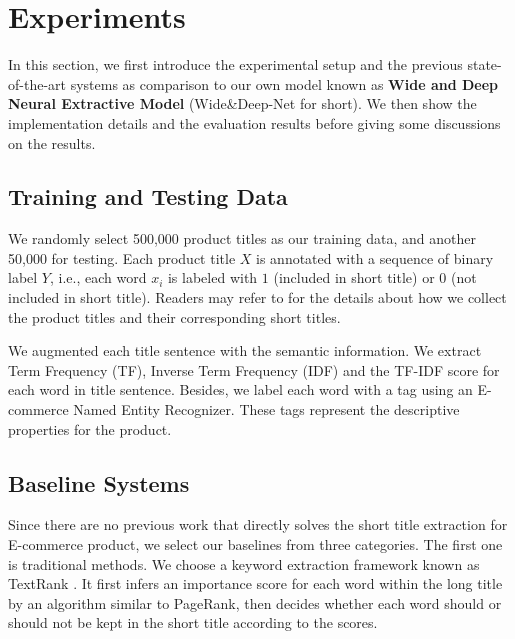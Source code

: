 \section{Experiments}
In this section, we first introduce the experimental setup and the
previous state-of-the-art systems as comparison to 
our own model known as \textbf{Wide and Deep Neural Extractive Model} (Wide\&Deep-Net for short).
We then show the implementation details and the evaluation results before
giving some discussions on the results.

\subsection{Training and Testing Data}

We randomly select 500,000 product titles as our training data, 
and another 50,000 for testing.
Each product title $X$ is annotated with a sequence of binary label $Y$,
i.e., each word $x_i$ is labeled with $1$ (included in short title) 
or $0$ (not included in short title). Readers may refer to  
for the details about how we collect the product titles
and their corresponding short titles.

We augmented each title sentence with the semantic information.
We extract Term Frequency (TF), Inverse Term Frequency (IDF) and the TF-IDF score for each word in title sentence.
Besides, we label each word with a tag using an E-commerce Named Entity Recognizer. %
These tags represent the descriptive properties for the product.


\subsection{Baseline Systems}
Since there are no previous work that directly solves the short title 
extraction for E-commerce product, we select our baselines from 
three categories. The first one is traditional methods. 
We choose a keyword extraction framework known as 
TextRank \cite{mihalcea2004textrank}.  It first infers an importance 
score for each word within the long title by an algorithm similar to PageRank, 
then decides whether each word should or should not be kept in the short title 
according to the scores.

